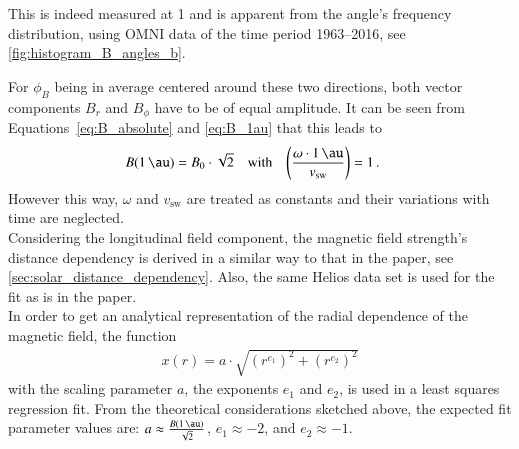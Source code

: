 This is indeed measured at \SI{1}{\au} and is apparent from the angle's frequency distribution, using OMNI data of the time period 1963--2016, see \autoref{fig:histogram_B_angles_b}.\\
\begin{figure}[htb]
\end{figure}

For $\phi_B$ being in average centered around these two directions, both vector components $B_r$ and $B_\phi$ have to be of equal amplitude. It can be seen from Equations~\ref{eq:B_absolute} and \ref{eq:B_1au} that this leads to
\begin{align}
	B(\SI{1}{\au}) &= B_0 \cdot \sqrt{2}	&\text{with}	&	&	\left(\frac{\omega\cdot\SI{1}{\au}}{v_\text{sw}}\right) &= 1\,.
\end{align}
However this way, $\omega$ and $v_\text{sw}$ are treated as constants and their variations with time are neglected.\\

Considering the longitudinal field component, the magnetic field strength's distance dependency is derived in a similar way to that in the paper, see \autoref{sec:solar_distance_dependency}. Also, the same Helios data set is used for the fit as is in the paper.\\

In order to get an analytical representation of the radial dependence of the magnetic field, the function
\begin{align}
	x(r) = a \cdot \sqrt{\left(r^{e_1}\right)^2 + \left(r^{e_2}\right)^2}	\label{eq:sqare_power_law}
\end{align}
with the scaling parameter $a$, the exponents $e_1$ and $e_2$, is used in a least squares regression fit. From the theoretical considerations sketched above, the expected fit parameter values are: $a \approx \frac{B(\SI{1}{\au})}{\sqrt{2}}$, $e_1 \approx -2$, and $e_2 \approx -1$.\\

